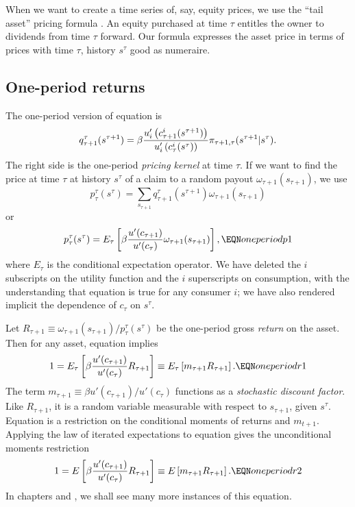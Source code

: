 When we want to create a time series of, say, equity prices,
we use the ``tail asset'' pricing formula .  An equity purchased
at time $\tau$ entitles the owner to  dividends from time
$\tau$ forward.   Our formula  expresses
the asset price in terms of prices with time $\tau$, history
$s^\tau$ good as numeraire.





\subsection{One-period returns}
The one-period version of equation  is
$$q^\tau_{\tau+1}(s^{\tau +1}) = \beta 
  {u'_i\left(c_{\tau+1}^i(s^{\tau+1})\right)
    \over u'_i\left(c_\tau^i(s^\tau)\right) } 
\pi_{\tau+1,\tau}(s^{\tau+1} \vert s^\tau). $$
The right side is the one-period {\it pricing kernel} at time $\tau$.
If we want to  find the  price  at time $\tau$ at history $s^\tau$
of a claim to a random payout $\omega_{\tau+1}(s_{\tau+1})$, 
we use
$$ p^\tau_{\tau}(s^\tau) = \sum_{s_{\tau+1}} q^\tau_{\tau+1}(s^{\tau+1})
      \omega_{\tau+1}(s_{\tau+1}) $$
or
$$ p^\tau_{\tau}(s^\tau) = E_\tau \left[\beta {u'(c_{\tau+1}) \over u'(c_{\tau})}
       \omega_{\tau+1}(s_{\tau +1}) \right], \EQN oneperiodp1 $$
where $E_\tau$ is the conditional expectation operator.
We have deleted the $i$ subscripts on the utility function
and the $i$ superscripts on consumption, with the
understanding that equation  is true for any consumer $i$;
we have also rendered implicit the  dependence of $c_{\tau}$ on $s^\tau$.


Let $R_{\tau+1} \equiv \omega_{\tau+1}(s_{\tau+1}) 
/p^\tau_{\tau}(s^\tau) $
 be the one-period gross {\it return} on the asset.
Then for any asset, equation  implies
$$ 1 = E_\tau \left[\beta{u'(c_{\tau+1}) \over u'(c_\tau)} R_{\tau+1} \right]
     \equiv E_\tau \left[ m_{\tau+1} R_{\tau+1} \right]  .
    \EQN oneperiodr1 $$
The term $m_{\tau+1} \equiv \beta u'(c_{\tau+1}) / u'(c_\tau)$
functions as a {\it stochastic discount factor}.    Like
$R_{\tau+1}$, it is a random %
variable  measurable with respect to $s_{\tau+1}$, given
$s^{\tau}$.
    Equation  is a restriction on
the conditional moments of returns and $m_{t+1}$.  Applying
the law of iterated expectations to equation  gives
the unconditional moments restriction
$$ 1 = E \left[\beta{u'(c_{\tau+1}) \over u'(c_\tau)} R_{\tau+1} \right]
     \equiv E \left[ m_{\tau+1} R_{\tau+1} \right]  .
    \EQN oneperiodr2 $$
In chapters  and , we shall see many more instances of this
equation.


